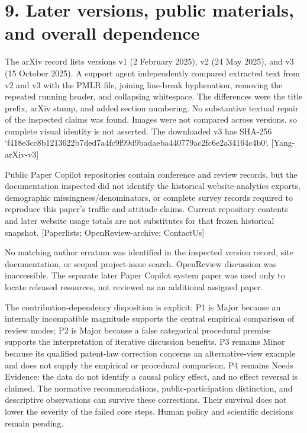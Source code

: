 \documentclass[10pt]{article}
\begin{document}
\section*{9. Later versions, public materials, and overall dependence}
The arXiv record lists versions v1 (2 February 2025), v2 (24 May 2025), and v3 (15 October 2025). A support agent independently compared extracted text from v2 and v3 with the PMLR file, joining line-break hyphenation, removing the repeated running header, and collapsing whitespace. The differences were the title prefix, arXiv stamp, and added section numbering. No substantive textual repair of the inspected claims was found. Images were not compared across versions, so complete visual identity is not asserted. The downloaded v3 has SHA-256 `f418e3cc8b1213622b7ded7a4fc9f99d9badaeba440779ac2fc6e2a34164c4b0`. [Yang-arXiv-v3]\par
Public Paper Copilot repositories contain conference and review records, but the documentation inspected did not identify the historical website-analytics exports, demographic missingness/denominators, or complete survey records required to reproduce this paper’s traffic and attitude claims. Current repository contents and later website usage totals are not substitutes for that frozen historical snapshot. [Paperlists; OpenReview-archive; ContactUs]\par
No matching author erratum was identified in the inspected version record, site documentation, or scoped project-issue search. OpenReview discussion was inaccessible. The separate later Paper Copilot system paper was used only to locate released resources, not reviewed as an additional assigned paper.\par
The contribution-dependency disposition is explicit: P1 is Major because an internally incompatible magnitude supports the central empirical comparison of review modes; P2 is Major because a false categorical procedural premise supports the interpretation of iterative discussion benefits. P3 remains Minor because its qualified patent-law correction concerns an alternative-view example and does not supply the empirical or procedural comparison. P4 remains Needs Evidence: the data do not identify a causal policy effect, and no effect reversal is claimed. The normative recommendations, public-participation distinction, and descriptive observations can survive these corrections. Their survival does not lower the severity of the failed core steps. Human policy and scientific decisions remain pending.\par
\end{document}

